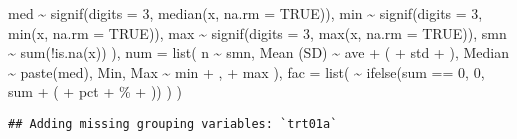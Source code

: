 \documentclass[
]{article}
\newenvironment{Shaded}{\begin{snugshade}}{\end{snugshade}}
\newcommand{\AttributeTok}[1]{\textcolor[rgb]{0.77,0.63,0.00}{#1}}
\newcommand{\ConstantTok}[1]{\textcolor[rgb]{0.00,0.00,0.00}{#1}}
\newcommand{\DecValTok}[1]{\textcolor[rgb]{0.00,0.00,0.81}{#1}}
\newcommand{\FunctionTok}[1]{\textcolor[rgb]{0.00,0.00,0.00}{#1}}
\newcommand{\NormalTok}[1]{#1}
\newcommand{\SpecialCharTok}[1]{\textcolor[rgb]{0.00,0.00,0.00}{#1}}
\newcommand{\StringTok}[1]{\textcolor[rgb]{0.31,0.60,0.02}{#1}}
\begin{document}
\begin{Shaded}
\begin{Highlighting}[]
\NormalTok{      med }\SpecialCharTok{\textasciitilde{}} \FunctionTok{signif}\NormalTok{(}\AttributeTok{digits =} \DecValTok{3}\NormalTok{,  }\FunctionTok{median}\NormalTok{(x,  }\AttributeTok{na.rm =} \ConstantTok{TRUE}\NormalTok{)),}
\NormalTok{      min }\SpecialCharTok{\textasciitilde{}} \FunctionTok{signif}\NormalTok{(}\AttributeTok{digits =} \DecValTok{3}\NormalTok{,     }\FunctionTok{min}\NormalTok{(x,  }\AttributeTok{na.rm =} \ConstantTok{TRUE}\NormalTok{)),}
\NormalTok{      max }\SpecialCharTok{\textasciitilde{}} \FunctionTok{signif}\NormalTok{(}\AttributeTok{digits =} \DecValTok{3}\NormalTok{,     }\FunctionTok{max}\NormalTok{(x,  }\AttributeTok{na.rm =} \ConstantTok{TRUE}\NormalTok{)),}
\NormalTok{      smn }\SpecialCharTok{\textasciitilde{}} \FunctionTok{sum}\NormalTok{(}\SpecialCharTok{!}\FunctionTok{is.na}\NormalTok{(x))}
\NormalTok{    ),}
    \AttributeTok{num =} \FunctionTok{list}\NormalTok{(}
\NormalTok{      n }\SpecialCharTok{\textasciitilde{}}\NormalTok{ smn,}
      \StringTok{\textasciigrave{}}\AttributeTok{Mean (SD)}\StringTok{\textasciigrave{}} \SpecialCharTok{\textasciitilde{}}\NormalTok{  ave }\SpecialCharTok{+} \StringTok{\textquotesingle{} (\textquotesingle{}} \SpecialCharTok{+}\NormalTok{ std }\SpecialCharTok{+} \StringTok{\textquotesingle{})\textquotesingle{}}\NormalTok{,}
\NormalTok{      Median }\SpecialCharTok{\textasciitilde{}}  \FunctionTok{paste}\NormalTok{(med),}
      \StringTok{\textasciigrave{}}\AttributeTok{Min, Max}\StringTok{\textasciigrave{}} \SpecialCharTok{\textasciitilde{}}\NormalTok{  min }\SpecialCharTok{+} \StringTok{\textquotesingle{}, \textquotesingle{}} \SpecialCharTok{+}\NormalTok{ max}
\NormalTok{    ),}
    \AttributeTok{fac =} \FunctionTok{list}\NormalTok{(}
      \StringTok{\textasciigrave{}}\AttributeTok{ }\StringTok{\textasciigrave{}} \SpecialCharTok{\textasciitilde{}} \FunctionTok{ifelse}\NormalTok{(sum }\SpecialCharTok{==} \DecValTok{0}\NormalTok{, }\StringTok{\textquotesingle{}0\textquotesingle{}}\NormalTok{, sum }\SpecialCharTok{+} \StringTok{\textquotesingle{} (\textquotesingle{}} \SpecialCharTok{+}\NormalTok{ pct }\SpecialCharTok{+} \StringTok{\textquotesingle{}\%\textquotesingle{}} \SpecialCharTok{+} \StringTok{\textquotesingle{})\textquotesingle{}}\NormalTok{)}
\NormalTok{    )}
\NormalTok{  )}
\end{Highlighting}
\end{Shaded}

\begin{verbatim}
## Adding missing grouping variables: `trt01a`
\end{verbatim}
\end{document}

